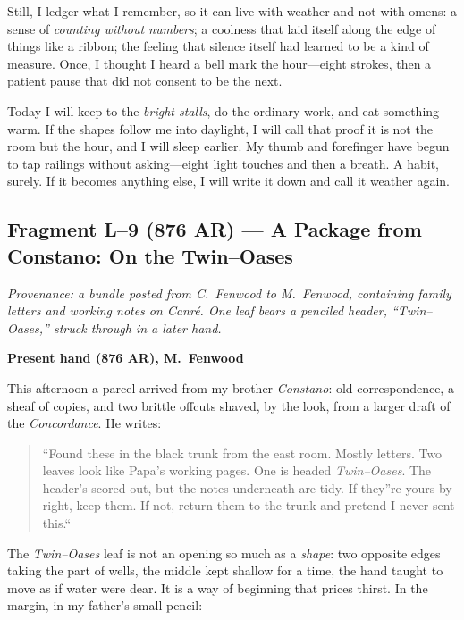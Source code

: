 \documentclass[11pt]{article}
\numberwithin{equation}{section} %
\theoremstyle{plain} %
\theoremstyle{definition} %
\theoremstyle{remark} %
\begin{document}
Still, I ledger what I remember, so it can live with weather and not with omens: a sense of \emph{counting without numbers}; a coolness that laid itself along the edge of things like a ribbon; the feeling that silence itself had learned to be a kind of measure. Once, I thought I heard a bell mark the hour---eight strokes, then a patient pause that did not consent to be the next.

Today I will keep to the \emph{bright stalls}, do the ordinary work, and eat something warm. If the shapes follow me into daylight, I will call that proof it is not the room but the hour, and I will sleep earlier. My thumb and forefinger have begun to tap railings without asking---eight light touches and then a breath. A habit, surely. If it becomes anything else, I will write it down and call it weather again.

\subsection{Fragment L--9 (876 AR) --- A Package from Constano: On the Twin--Oases}
\label{frag:l9}

\noindent\textit{Provenance: a bundle posted from C.\ Fenwood to M.\ Fenwood, containing family letters and working notes on \emph{Canr\'e}. One leaf bears a penciled header, ``Twin--Oases,'' struck through in a later hand.}

\medskip
\noindent\textbf{Present hand (876 AR), M.\ Fenwood}

This afternoon a parcel arrived from my brother \textit{Constano}: old correspondence, a sheaf of copies, and two brittle offcuts shaved, by the look, from a larger draft of the \emph{Concordance}. He writes:

\begin{quote}\small
``Found these in the black trunk from the east room. Mostly letters. Two leaves look like Papa's working pages. One is headed \emph{Twin--Oases}. The header's scored out, but the notes underneath are tidy. If they''re yours by right, keep them. If not, return them to the trunk and pretend I never sent this.``
\end{quote}

The \emph{Twin--Oases} leaf is not an opening so much as a \emph{shape}: two opposite edges taking the part of wells, the middle kept shallow for a time, the hand taught to move as if water were dear. It is a way of beginning that prices thirst. In the margin, in my father's small pencil:
\end{document}
